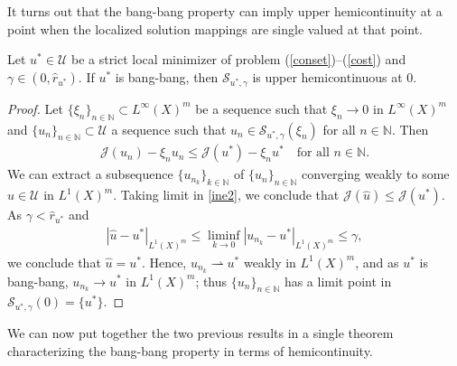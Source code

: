 \documentclass[hidelinks,onefignum,onetabnum]{siamart220329}
\begin{document}
It turns out that the bang-bang property can imply upper hemicontinuity at a point when the  localized solution mappings are single valued at that point.



\begin{proposition}
	Let $u^*\in\mathcal U$ be a strict local minimizer of problem (\ref{conset})--(\ref{cost}) and $\gamma\in(0,\hat r_{u^*})$. If $u^*$ is bang-bang, then $\mathcal S_{u^*,\gamma}$ is upper hemicontinuous at $0$.
\end{proposition}
\begin{proof}
 Let $\{\xi_{n}\}_{n\in\mathbb N}\subset L^\infty(X)^m$ be a sequence such that $\xi_n\to 0$ in $L^\infty(X)^m$ and $\{u_n\}_{n\in\mathbb N}\subset \mathcal U$ a sequence such that $u_n\in\mathcal S_{u^*,\gamma}(\xi_n)$ for all $n\in\mathbb N$.
  Then 
\begin{align}\label{ine2}
	\mathcal J(u_n)-\xi_n u_n\le \mathcal J(u^*)-\xi_n u^*\quad\text{for all $n\in\mathbb N$.}
\end{align}
We can extract a subsequence $\{u_{n_k}\}_{k\in\mathbb N}$ of   $\{u_n\}_{n\in\mathbb N}$ converging weakly to some $\hat u\in\mathcal U$ in $L^1(X)^m$. 
 Taking limit in \cref{ine2}, we conclude that $\mathcal J(\hat u)\le \mathcal J(u^*)$.  As $\gamma<\hat r_{u^*}$ and 
 \begin{align*}
 	|\hat u-u^*|_{L^1(X)^m}\le\liminf_{k\to 0}|u_{n_k}-u^*|_{L^1(X)^m}\le \gamma,
 \end{align*}
  we conclude that $\hat u=u^*$. Hence,  $u_{n_k}\rightharpoonup u^*$ weakly in $L^1(X)^m$, and as $u^*$ is bang-bang,  $u_{n_k}\to u^*$ in $L^1(X)^m$; thus $\{u_n\}_{n\in\mathbb N}$ has a limit point in $\mathcal S_{u^*,\gamma}(0)=\{u^*\}$.
\end{proof}


We can now put together the two previous results in a single theorem characterizing the bang-bang property in terms of hemicontinuity.
\end{document}
